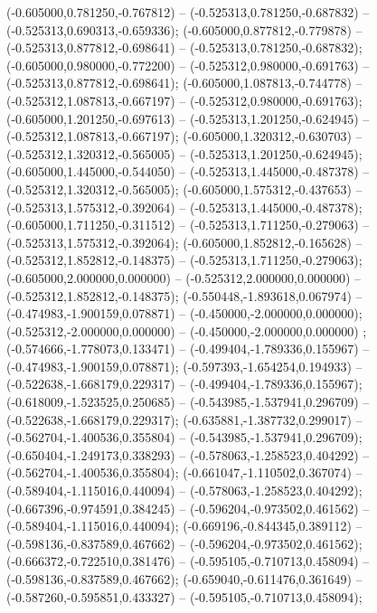  (-0.605000,0.781250,-0.767812) -- (-0.525313,0.781250,-0.687832) -- (-0.525313,0.690313,-0.659336);
 (-0.605000,0.877812,-0.779878) -- (-0.525313,0.877812,-0.698641) -- (-0.525313,0.781250,-0.687832);
 (-0.605000,0.980000,-0.772200) -- (-0.525312,0.980000,-0.691763) -- (-0.525313,0.877812,-0.698641);
 (-0.605000,1.087813,-0.744778) -- (-0.525312,1.087813,-0.667197) -- (-0.525312,0.980000,-0.691763);
 (-0.605000,1.201250,-0.697613) -- (-0.525313,1.201250,-0.624945) -- (-0.525312,1.087813,-0.667197);
 (-0.605000,1.320312,-0.630703) -- (-0.525312,1.320312,-0.565005) -- (-0.525313,1.201250,-0.624945);
 (-0.605000,1.445000,-0.544050) -- (-0.525313,1.445000,-0.487378) -- (-0.525312,1.320312,-0.565005);
 (-0.605000,1.575312,-0.437653) -- (-0.525313,1.575312,-0.392064) -- (-0.525313,1.445000,-0.487378);
 (-0.605000,1.711250,-0.311512) -- (-0.525313,1.711250,-0.279063) -- (-0.525313,1.575312,-0.392064);
 (-0.605000,1.852812,-0.165628) -- (-0.525312,1.852812,-0.148375) -- (-0.525313,1.711250,-0.279063);
 (-0.605000,2.000000,0.000000) -- (-0.525312,2.000000,0.000000) -- (-0.525312,1.852812,-0.148375);
 (-0.550448,-1.893618,0.067974) -- (-0.474983,-1.900159,0.078871) -- (-0.450000,-2.000000,0.000000);
 (-0.525312,-2.000000,0.000000) -- (-0.450000,-2.000000,0.000000) ;
 (-0.574666,-1.778073,0.133471) -- (-0.499404,-1.789336,0.155967) -- (-0.474983,-1.900159,0.078871);
 (-0.597393,-1.654254,0.194933) -- (-0.522638,-1.668179,0.229317) -- (-0.499404,-1.789336,0.155967);
 (-0.618009,-1.523525,0.250685) -- (-0.543985,-1.537941,0.296709) -- (-0.522638,-1.668179,0.229317);
 (-0.635881,-1.387732,0.299017) -- (-0.562704,-1.400536,0.355804) -- (-0.543985,-1.537941,0.296709);
 (-0.650404,-1.249173,0.338293) -- (-0.578063,-1.258523,0.404292) -- (-0.562704,-1.400536,0.355804);
 (-0.661047,-1.110502,0.367074) -- (-0.589404,-1.115016,0.440094) -- (-0.578063,-1.258523,0.404292);
 (-0.667396,-0.974591,0.384245) -- (-0.596204,-0.973502,0.461562) -- (-0.589404,-1.115016,0.440094);
 (-0.669196,-0.844345,0.389112) -- (-0.598136,-0.837589,0.467662) -- (-0.596204,-0.973502,0.461562);
 (-0.666372,-0.722510,0.381476) -- (-0.595105,-0.710713,0.458094) -- (-0.598136,-0.837589,0.467662);
 (-0.659040,-0.611476,0.361649) -- (-0.587260,-0.595851,0.433327) -- (-0.595105,-0.710713,0.458094);

